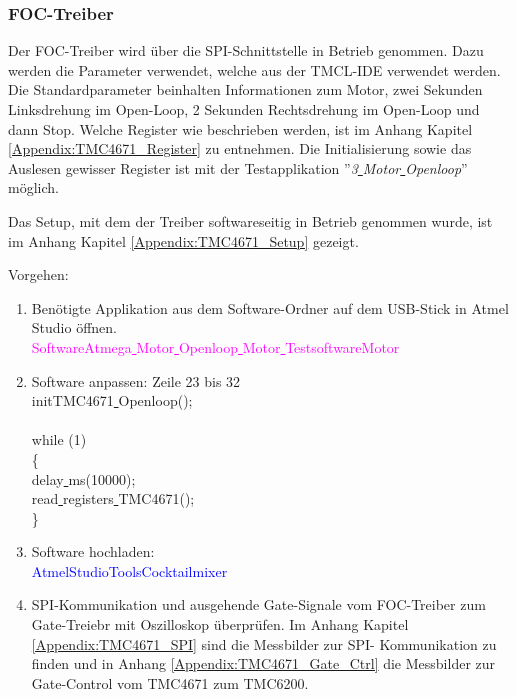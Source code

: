 \subsubsection{FOC-Treiber}
\label{subsubsec:Inbetriebnahme_FOC_Treiber}

Der FOC-Treiber wird über die SPI-Schnittstelle in Betrieb genommen. Dazu werden die Parameter verwendet, welche aus der TMCL-IDE verwendet werden. Die Standardparameter beinhalten Informationen zum Motor, zwei Sekunden Linksdrehung im Open-Loop, 2 Sekunden Rechtsdrehung im Open-Loop und dann Stop. Welche Register wie beschrieben werden, ist im Anhang Kapitel \ref{Appendix:TMC4671_Register} zu entnehmen. Die Initialisierung sowie das Auslesen gewisser Register ist mit der Testapplikation ''\textit{3\underline{ }Motor\underline{ }Openloop}'' möglich.

Das Setup, mit dem der Treiber softwareseitig in Betrieb genommen wurde, ist im Anhang Kapitel \ref{Appendix:TMC4671_Setup} gezeigt.

Vorgehen:
\begin{enumerate}
\item Benötigte Applikation aus dem Software-Ordner auf dem USB-Stick in Atmel Studio öffnen.\\
\textcolor{magenta}{Software\textrightarrow Atmega\underline{ }Motor\underline{ }Openloop\underline{ }Motor\underline{ }Testsoftware\textrightarrow Motor}\\

\item Software anpassen: Zeile 23 bis 32\\
\textcolor{OliveGreen}{
	initTMC4671\underline{ }Openloop();\\
\\
    while (1) \\
    \{\\
		\underline{ }delay\underline{ }ms(10000);\\
		read\underline{ }registers\underline{ }TMC4671();\\
    \}
}\\

\item Software hochladen:\\
\textcolor{blue}{AtmelStudio\textrightarrow Tools\textrightarrow Cocktailmixer}\\

\item SPI-Kommunikation und ausgehende Gate-Signale vom FOC-Treiber zum Gate-Treiebr mit Oszilloskop überprüfen. Im Anhang Kapitel \ref{Appendix:TMC4671_SPI} sind die Messbilder zur SPI- Kommunikation zu finden und in Anhang \ref{Appendix:TMC4671_Gate_Ctrl} die Messbilder zur Gate-Control vom TMC4671 zum TMC6200.
\end{enumerate}